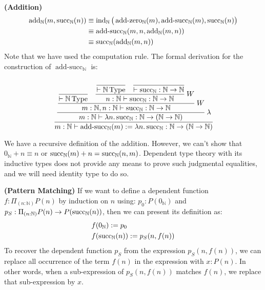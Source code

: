 \begin{definition}{\textbf{(Addition)}}
    \begin{equation*}
    \begin{aligned}
        \operatorname{add}_\mathbb{N}(m,\operatorname{succ}_\mathbb{N}(n)) &\equiv \operatorname{ind}_\mathbb{N}\big( \operatorname{add-zero}_\mathbb{N}(m),\operatorname{add-succ}_\mathbb{N}(m),\operatorname{succ}_\mathbb{N}(n) \big) \\
        &\equiv \operatorname{add-succ}_\mathbb{N}(m,n,\operatorname{add}_\mathbb{N}(m,n)) \\
        &\equiv \operatorname{succ}_\mathbb{N}(\operatorname{add}_\mathbb{N}(m,n))
    \end{aligned}
    \end{equation*}
    Note that we have used the computation rule. The formal derivation for the construction of $\operatorname{add-succ}_\mathbb{N}$ is:
    \begin{equation*}
        \cfrac{\cfrac{\cfrac{\cfrac{}{\vdash\mathbb{N}\type}\quad\cfrac{\cfrac{}{\vdash\mathbb{N}\type}\quad\cfrac{}{\vdash\succnat:\mathbb{N}\rightarrow\mathbb{N}}}{n:\mathbb{N}\vdash\succnat:\mathbb{N}\rightarrow\mathbb{N}} \ W}{m:\mathbb{N},n:\mathbb{N}\vdash\succnat:\mathbb{N}\rightarrow\mathbb{N}} \ W}{m:\mathbb{N}\vdash\lambda n.\succnat:\mathbb{N}\rightarrow(\mathbb{N}\rightarrow\mathbb{N})} \ \lambda}{m:\mathbb{N}\vdash\operatorname{add-succ}_\mathbb{N}(m):=\lambda n.\succnat:\mathbb{N}\rightarrow(\mathbb{N}\rightarrow\mathbb{N})}
    \end{equation*}
\end{definition}

\begin{remark}
    We have a recursive definition of the addition. However, we can't show that $0_\mathbb{N}+n\equiv n$ or $\operatorname{succ}_\mathbb{N}(m)+n=\operatorname{succ}_\mathbb{N}(n, m)$. Dependent type theory with its inductive types does not provide any means to prove such judgmental equalities, and we will need identity type to do so.
\end{remark}

\begin{definition}{\textbf{(Pattern Matching)}}
    If we want to define a dependent function $f:\Pi_{(n:\mathbb{N})}P(n)$ by induction on $n$ using: $p_0:P(0_\mathbb{N})$ and $p_S:\Pi_{(n:\mathbb{N})}P(n) \rightarrow P(\operatorname{succ}_\mathbb{N}(n))$, then we can present its definition as:
    \begin{equation*}
    \begin{aligned} 
        &f(0_\mathbb{N}) := p_0 \\ 
        &f(\operatorname{succ}_\mathbb{N}(n)) := p_S(n,f(n)) 
    \end{aligned}
    \end{equation*}
    To recover the dependent function $p_S$ from the expression $p_S(n,f(n))$, we can replace all occurrence of the term $f(n)$ in the expression with $x:P(n)$. In other words, when a sub-expression of $p_S(n,f(n))$ matches $f(n)$, we replace that sub-expression by $x$.
\end{definition}


